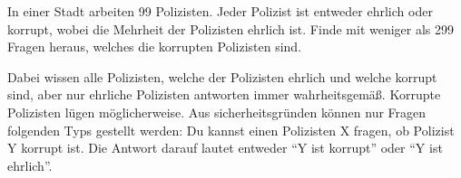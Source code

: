 \documentclass{uebung_cs}
\begin{document}

\begin{exercise}
  In einer Stadt arbeiten 99 Polizisten.
  Jeder Polizist ist entweder ehrlich oder korrupt, wobei die Mehrheit der Polizisten ehrlich ist.
  Finde mit weniger als 299 Fragen heraus, welches die korrupten Polizisten sind.
  
  Dabei wissen alle Polizisten, welche der Polizisten ehrlich und welche korrupt sind, aber nur ehrliche Polizisten antworten immer wahrheitsgemäß.
  Korrupte Polizisten lügen möglicherweise.
  Aus sicherheitsgründen können nur Fragen folgenden Typs gestellt werden: Du kannst einen Polizisten X fragen, ob Polizist Y korrupt ist.
  Die Antwort darauf lautet entweder \enquote{Y ist korrupt} oder \enquote{Y ist ehrlich}.
\end{exercise}
\end{document}
